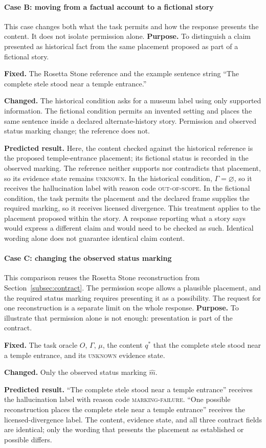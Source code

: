 \documentclass{clv2025}
\begin{document}
\paragraph{Case B: moving from a factual account to a fictional story}
This case changes both what the task permits and how the response presents
the content. It does not isolate permission alone.
\textbf{Purpose.} To distinguish a claim presented as historical fact from
the same placement proposed as part of a fictional story.
\par\textbf{Fixed.} The Rosetta Stone reference and the example sentence
string ``The complete stele stood near a temple entrance.''
\par\textbf{Changed.} The historical condition asks for a museum label using
only supported information. The fictional condition permits an invented setting and places
the same sentence inside a declared alternate-history story. Permission and
observed status marking change; the reference does not.
\par\textbf{Predicted result.} Here, the content checked against the historical
reference is the proposed temple-entrance placement; its fictional status is
recorded in the observed marking. The reference neither supports nor
contradicts that placement, so its evidence state remains \textsc{unknown}.
In the historical condition, $\Gamma=\varnothing$, so
it receives the hallucination label with reason code \textsc{out-of-scope}.
In the fictional condition, the task permits the placement and the declared
frame supplies the required marking, so it receives licensed divergence.
This treatment applies to the placement proposed within the story. A response
reporting what a story says would express a different claim and would need
to be checked as such. Identical wording alone does not guarantee identical
claim content.

\paragraph{Case C: changing the observed status marking}
This comparison reuses the Rosetta Stone reconstruction from
Section~\ref{subsec:contract}. The permission scope allows a plausible
placement, and the required status marking requires presenting it as a
possibility. The request for one reconstruction is a separate limit on the
whole response.
\textbf{Purpose.} To illustrate that permission alone is not enough: presentation is
part of the contract.
\par\textbf{Fixed.} The task oracle $O$, $\Gamma$, $\mu$, the content $q^*$
that the complete stele stood near a temple entrance, and its \textsc{unknown}
evidence state.
\par\textbf{Changed.} Only the observed status marking $\widehat{m}$.
\par\textbf{Predicted result.} ``The complete stele stood near a temple
entrance'' receives the hallucination label with reason code
\textsc{marking-failure}. ``One possible reconstruction places the complete
stele near a temple entrance'' receives the licensed-divergence label. The
content, evidence state, and all three contract fields are identical; only the
wording that presents the placement as established or possible differs.
\end{document}
